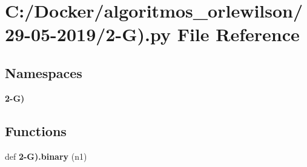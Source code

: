 \section{C\+:/\+Docker/algoritmos\+\_\+orlewilson/29-\/05-\/2019/2-\/G).py File Reference}
\label{2-_g_08_8py}
\subsection*{Namespaces}
\begin{DoxyCompactItemize}
\item 
 \textbf{ 2-\/\+G)}
\end{DoxyCompactItemize}
\subsection*{Functions}
\begin{DoxyCompactItemize}
\item 
def \textbf{ 2-\/\+G).\+binary} (n1)
\end{DoxyCompactItemize}
